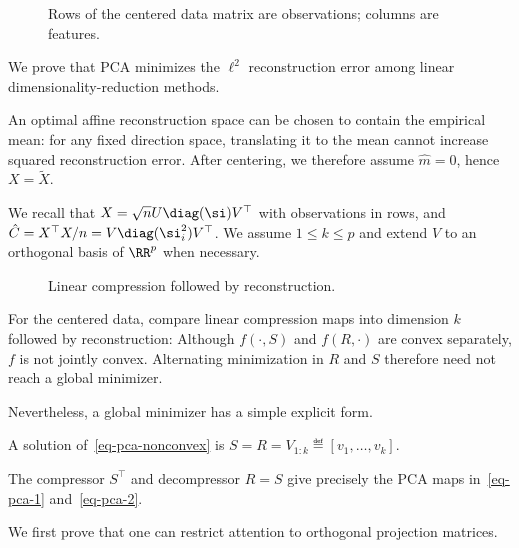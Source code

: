 \begin{figure}[tbp]
\centering
{}
\caption{Rows of the centered data matrix are observations; columns are features.}
\label{fig-review-ml-pca-data-matrix}
\end{figure}
We prove that PCA minimizes the $\ell^2$ reconstruction error among linear dimensionality-reduction methods.
 
An optimal affine reconstruction space can be chosen to contain the empirical mean: for any fixed direction space, translating it to the mean cannot increase squared reconstruction error. After centering, we therefore assume $\hat m=0$, hence $X=\tilde X$.

We recall that $X=\sqrt{n}U\diag(\si)V^\top$ with observations in rows, and $\hat C=X^\top X/n=V\diag(\si_i^2)V^\top$. We assume $1\leq k\leq p$ and extend $V$ to an orthogonal basis of $\RR^p$ when necessary.

\begin{figure}[tbp]
\centering
{}
\caption{Linear compression followed by reconstruction.}
\label{fig-review-ml-pca-compression-reconstruction}
\end{figure}
For the centered data, compare linear compression maps into dimension $k$ followed by reconstruction:
Although $f(\cdot,S)$ and $f(R,\cdot)$ are convex separately, $f$ is not jointly convex. Alternating minimization in $R$ and $S$ therefore need not reach a global minimizer.
 
Nevertheless, a global minimizer has a simple explicit form.

\begin{thm}\label{thm-pca-optim}
	A solution of~\eqref{eq-pca-nonconvex} is $S=R=V_{1:k} \eqdef [v_1,\ldots,v_k]$.
\end{thm}

The compressor $S^\top$ and decompressor $R=S$ give precisely the PCA maps in~\eqref{eq-pca-1} and~\eqref{eq-pca-2}.

We first prove that one can restrict attention to orthogonal projection matrices.

